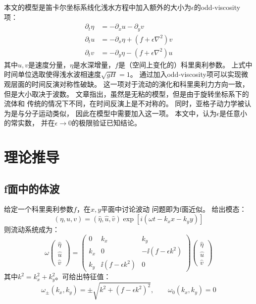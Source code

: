 \documentclass[UTF8,zihao=5]{ctexart} %
\begin{document}
本文的模型是笛卡尔坐标系线化浅水方程中加入额外的大小为$\epsilon$的odd-viscosity项：
\begin{align}
    \partial_t \eta & = - \partial_x u - \partial_y v                         \\
    \partial_t u    & =-\partial_x \eta+ \left(f +\epsilon  \nabla^2 \right)v \\
    \partial_t v    & =-\partial_y \eta- \left(f +\epsilon  \nabla^2 \right)u
\end{align}
其中$u,v$是速度分量，$\eta$是水深增量，$f$是（空间上变化的）科里奥利参数。
上式中时间单位选取使得浅水波相速度$\sqrt{gH}=1$。
通过加入odd-viscosity项可以实现微观层面的时间反演对称性破缺。
这一项对于流动的演化和科里奥利力方向一致，但是大小取决于波数。
文章指出，虽然是无粘的模型，但是由于旋转坐标系下的流体和
传统的情况下不同，在时间反演上是不对称的。
同时，亚格子动力学被认为是与分子运动类似，
因此在模型中需要加入这一项。
本文中，认为$\epsilon$是任意小的常实数，
并在$\epsilon\rightarrow0$的极限验证已知结论。

\section{理论推导}

\subsection{f面中的体波}

给定一个科里奥利参数$f$，在$x,y$平面中讨论波动
问题即为f面近似。
给出模态：
$$
    (\eta,u,v)=(\hat\eta,\hat{u},\hat{v})\exp{[i(\omega t - k_x x - k_y y)]}
$$
则流动系统成为：
\begin{equation}\label{eq:bulk_hamiltonian}
    \omega \begin{pmatrix}
        \hat \eta \\ \hat u \\ \hat v
    \end{pmatrix}=
    \begin{pmatrix}
        0 & k_x & k_y \\ k_x & 0 & -\ii (f-\epsilon  k^2) \\ k_y & \ii (f-\epsilon  k^2) & 0
    \end{pmatrix} \begin{pmatrix}
        \hat \eta \\ \hat u \\ \hat v
    \end{pmatrix}
\end{equation}
其中$k^2=k_x^2 + k_y^2$。可给出特征值：
\begin{equation}\label{eq:omegapm}
    \omega_\pm(k_x,k_y) = \pm \sqrt{k^2 + (f-\epsilon  k^2)^2}, \qquad \omega_0(k_x,k_y) = 0
\end{equation}
\end{document}
